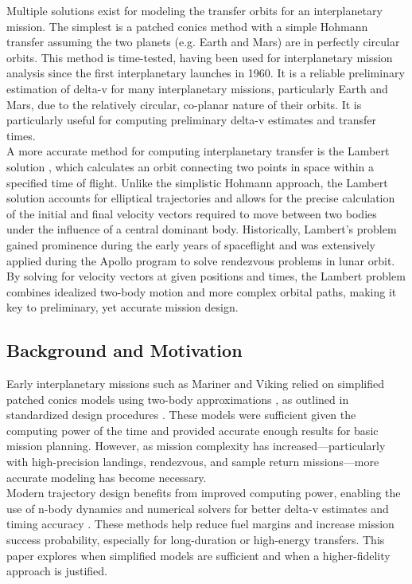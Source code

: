 \documentclass[conference]{IEEEtran}
\begin{document}
Multiple solutions exist for modeling the transfer orbits for an interplanetary mission. The simplest is a patched conics method \cite{b9} with a simple Hohmann transfer \cite{b10} assuming the two planets (e.g. Earth and Mars) are in perfectly circular orbits. This method is time-tested, having been used for interplanetary mission analysis since the first interplanetary launches in 1960. It is a reliable preliminary estimation of delta-v for many interplanetary missions, particularly Earth and Mars, due to the relatively circular, co-planar nature of their orbits. It is particularly useful for computing preliminary delta-v estimates and transfer times.\\

A more accurate method for computing interplanetary transfer is the Lambert solution \cite{b11,b12}, which calculates an orbit connecting two points in space within a specified time of flight. Unlike the simplistic Hohmann approach, the Lambert solution accounts for elliptical trajectories and allows for the precise calculation of the initial and final velocity vectors required to move between two bodies under the influence of a central dominant body. Historically, Lambert's problem gained prominence during the early years of spaceflight and was extensively applied during the Apollo program to solve rendezvous problems in lunar orbit. By solving for velocity vectors at given positions and times, the Lambert problem combines idealized two-body motion and more complex orbital paths, making it key to preliminary, yet accurate mission design.

\subsection{Background and Motivation}

Early interplanetary missions such as Mariner and Viking relied on simplified patched conics models using two-body approximations \cite{b15}, as outlined in standardized design procedures \cite{b3}. These models were sufficient given the computing power of the time and provided accurate enough results for basic mission planning. However, as mission complexity has increased—particularly with high-precision landings, rendezvous, and sample return missions—more accurate modeling has become necessary.\\

Modern trajectory design benefits from improved computing power, enabling the use of n-body dynamics and numerical solvers for better delta-v estimates and timing accuracy \cite{b16}. These methods help reduce fuel margins and increase mission success probability, especially for long-duration or high-energy transfers. This paper explores when simplified models are sufficient and when a higher-fidelity approach is justified.
\end{document}
